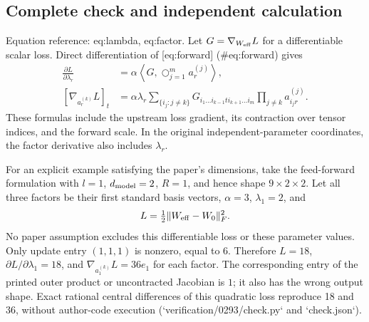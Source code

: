 \documentclass[10pt]{article}
\begin{document}
\subsection*{Complete check and independent calculation}
Equation reference: eq:lambda, eq:factor. Let \(G=\nabla_{W_{\rm eff}}L\) for a differentiable scalar loss. Direct differentiation of [eq:forward] (\#eq:forward) gives \[\begin{aligned}
 \frac{\partial L}{\partial\lambda_r}
 &=\alpha\left\langle G,\bigcirc_{j=1}^{m}a_r^{(j)}\right\rangle,\\
 \left[\nabla_{a_r^{(k)}}L\right]_t
 &=\alpha\lambda_r\!
 \sum_{\{i_j:j\ne k\}}
 G_{i_1\ldots i_{k-1}t i_{k+1}\ldots i_m}
 \prod_{j\ne k}a_{i_jr}^{(j)}.\end{aligned}\] These formulas include the upstream loss gradient, its contraction over tensor indices, and the forward scale. In the original independent-parameter coordinates, the factor derivative also includes \(\lambda_r\).\par
For an explicit example satisfying the paper’s dimensions, take the feed-forward formulation with \(l=1\), \(d_{\rm model}=2\), \(R=1\), and hence shape \(9\times2\times2\). Let all three factors be their first standard basis vectors, \(\alpha=3\), \(\lambda_1=2\), and \[L=\tfrac12\|W_{\rm eff}-W_0\|_F^2.\] No paper assumption excludes this differentiable loss or these parameter values. Only update entry \((1,1,1)\) is nonzero, equal to \(6\). Therefore \(L=18\), \(\partial L/\partial\lambda_1=18\), and \(\nabla_{a_1^{(k)}}L=36e_1\) for each factor. The corresponding entry of the printed outer product or uncontracted Jacobian is \(1\); it also has the wrong output shape. Exact rational central differences of this quadratic loss reproduce 18 and 36, without author-code execution (`verification/0293/check.py` and `check.json`).\par
\end{document}

